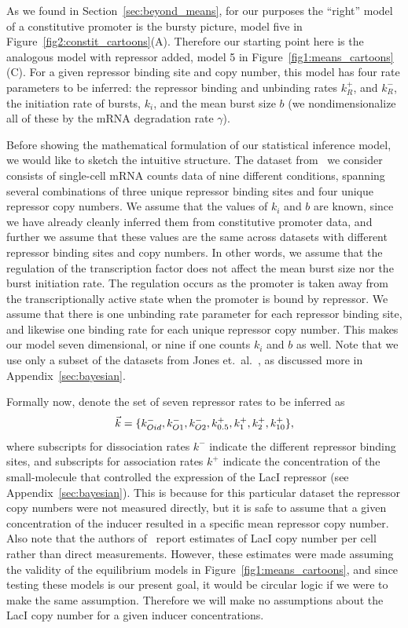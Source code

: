 As we found in Section~\ref{sec:beyond_means}, for our purposes the ``right''
model of a constitutive promoter is the bursty picture, model five in
Figure~\ref{fig2:constit_cartoons}(A). Therefore our starting point here is the
analogous model with repressor added, model 5 in
Figure~\ref{fig1:means_cartoons}(C). For a given repressor binding site and copy
number, this model has four rate parameters to be inferred: the repressor
binding and unbinding rates $k_R^+$, and $k_R^-$, the initiation rate of bursts,
$k_i$, and the mean burst size $b$ (we nondimensionalize all of these by the
mRNA degradation rate $\gamma$).

Before showing the mathematical formulation of our statistical inference model,
we would like to sketch the intuitive structure. The dataset
from~\cite{Jones2014} we consider consists of single-cell mRNA counts data of
nine different conditions, spanning several combinations of three unique
repressor binding sites and four unique repressor copy numbers. We assume that
the values of $k_i$ and $b$ are known, since we have already cleanly inferred
them from constitutive promoter data, and further we assume that these values
are the same across datasets with different repressor binding sites and copy
numbers. In other words, we assume that the regulation of the transcription
factor does not affect the mean burst size nor the burst initiation rate. The
regulation occurs as the promoter is taken away from the transcriptionally
active state when the promoter is bound by repressor. We assume that there is
one unbinding rate parameter for each repressor binding site, and likewise one
binding rate for each unique repressor copy number. This makes our model seven
dimensional, or nine if one counts $k_i$ and $b$ as well. Note that we use only
a subset of the datasets from Jones et.\ al.~\cite{Jones2014}, as discussed more
in Appendix~\ref{sec:bayesian}.

Formally now, denote the set of seven repressor rates to be inferred as
\begin{equation}
\vec{k} =\{k_{Oid}^-, k_{O1}^-, k_{O2}^-,
k_{0.5}^+, k_{1}^+, k_{2}^+, k_{10}^+\},
\end{equation}
where subscripts for dissociation rates $k^-$  indicate the different repressor
binding sites, and subscripts for association rates $k^+$ indicate the
concentration of the small-molecule that controlled the expression of the LacI
repressor (see Appendix~\ref{sec:bayesian}). This is because for this particular
dataset the repressor copy numbers were not measured directly, but it is safe to
assume that a given concentration of the inducer resulted in a specific mean
repressor copy number\cite{Chure2019a}. Also note that the authors
of~\cite{Jones2014} report estimates of LacI copy number per cell rather than
direct measurements. However, these estimates were made assuming the validity of
the equilibrium models in Figure~\ref{fig1:means_cartoons}, and since testing
these models is our present goal, it would be circular logic if we were to make
the same assumption. Therefore we will make no assumptions about the LacI copy
number for a given inducer concentrations.


